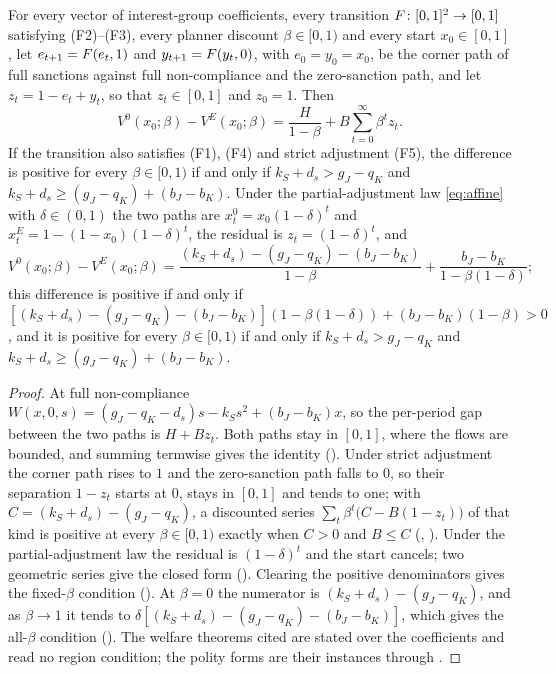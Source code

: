 \begin{proposition}
\label{prop:affine-welfare-gap}
For every vector of interest-group coefficients, every transition
$F\colon[0,1]^2\to[0,1]$ satisfying \textup{(F2)--(F3)}, every planner
discount $\beta\in[0,1)$ and every start $x_0\in[0,1]$, let
$e_{t+1}=F(e_t,1)$ and $y_{t+1}=F(y_t,0)$, with $e_0=y_0=x_0$, be the
corner path of full sanctions against full non-compliance and the zero-sanction path, and let $z_t=1-e_t+y_t$, so
that $z_t\in[0,1]$ and $z_0=1$. Then
\[
V^0(x_0;\beta)-V^E(x_0;\beta)
=\frac{H}{1-\beta}+B\sum_{t=0}^{\infty}\beta^tz_t .
\]
If the transition also satisfies \textup{(F1)}, \textup{(F4)} and strict
adjustment \textup{(F5)}, the difference is positive for every
$\beta\in[0,1)$ if and only if $k_S+d_s>g_J-q_K$ and
$k_S+d_s\ge(g_J-q_K)+(b_J-b_K)$. Under the partial-adjustment law \eqref{eq:affine} with
$\delta\in(0,1)$ the two paths are $x^0_t=x_0(1-\delta)^t$ and
$x^E_t=1-(1-x_0)(1-\delta)^t$, the residual is $z_t=(1-\delta)^t$, and
\[
V^0(x_0;\beta)-V^E(x_0;\beta)
=\frac{(k_S+d_s)-(g_J-q_K)-(b_J-b_K)}{1-\beta}
+\frac{b_J-b_K}{1-\beta(1-\delta)} ;
\]
this difference is positive if and only if
$[(k_S+d_s)-(g_J-q_K)-(b_J-b_K)](1-\beta(1-\delta))+(b_J-b_K)(1-\beta)>0$,
and it is positive for every $\beta\in[0,1)$ if and only if
$k_S+d_s>g_J-q_K$ and $k_S+d_s\ge(g_J-q_K)+(b_J-b_K)$.
\end{proposition}

\begin{proof}
At full non-compliance $W(x,0,s)=(g_J-q_K-d_s)s-k_Ss^2+(b_J-b_K)x$, so the
per-period gap between the two paths is $H+Bz_t$. Both paths stay in $[0,1]$,
where the flows are bounded, and summing termwise gives the identity
(). Under strict adjustment the
corner path rises to $1$ and the zero-sanction path falls to $0$, so their
separation $1-z_t$ starts at $0$, stays in $[0,1]$ and tends to one; with
$C=(k_S+d_s)-(g_J-q_K)$, a discounted series $\sum_t\beta^t\bigl(C-B(1-z_t)\bigr)$
of that kind is positive at every $\beta\in[0,1)$ exactly when $C>0$ and
$B\le C$ (,
). Under the partial-adjustment
law the residual is $(1-\delta)^t$ and the start cancels; two geometric series
give the closed form (). Clearing the
positive denominators gives the fixed-$\beta$ condition
(). At $\beta=0$ the numerator is
$(k_S+d_s)-(g_J-q_K)$, and as $\beta\to1$ it tends to
$\delta[(k_S+d_s)-(g_J-q_K)-(b_J-b_K)]$, which gives the all-$\beta$ condition
(). The welfare theorems cited are
stated over the coefficients and read no region condition; the polity forms are
their instances through .
\end{proof}

